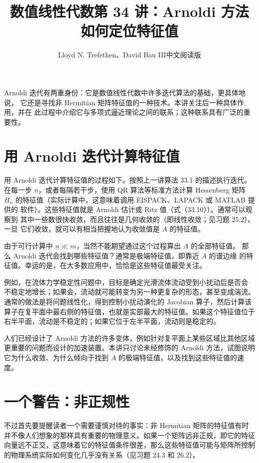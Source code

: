 \documentclass[UTF8,fontset=none,12pt]{ctexart}
\title{数值线性代数\quad 第 34 讲：Arnoldi 方法如何定位特征值}
\author{Lloyd N. Trefethen、David Bau III\quad 中文阅读版}
\date{}
\begin{document}
\maketitle
\pagestyle{plain}

Arnoldi 迭代有两重身份：它是数值线性代数中许多迭代算法的基础，更具体地说，
它还是寻找非 Hermitian 矩阵特征值的一种技术。本讲关注后一种具体作用，并在
此过程中介绍它与多项式逼近理论之间的联系；这种联系具有广泛的重要性。

\section*{用 Arnoldi 迭代计算特征值}

用 Arnoldi 迭代计算特征值的过程如下。按照上一讲算法 33.1 的描述执行迭代。
在每一步 $n$，或者每隔若干步，使用 QR 算法等标准方法计算 Hessenberg 矩阵
$H_n$ 的特征值（实际计算中，这意味着调用 EISPACK、LAPACK 或 MATLAB 提供的
软件）。这些特征值就是 Arnoldi 估计或 Ritz 值（式（33.10））。通常可以观察到
其中一些数很快收敛，而且往往是几何收敛的（即线性收敛；见习题 25.2）。一旦
它们收敛，就可以有相当把握地认为收敛值是 $A$ 的特征值。

由于可行计算中 $n\ll m$，当然不能期望通过这个过程算出 $A$ 的全部特征值。
那么 Arnoldi 迭代会找到哪些特征值？通常是极端特征值，即靠近 $A$ 的谱边缘
的特征值。幸运的是，在大多数应用中，恰恰是这些特征值最受关注。

例如，在流体力学稳定性问题中，目标是确定光滑流体流动受到小扰动后是否会
不稳定地增长；如果会，流动就可能转变为另一种更复杂的形态，甚至变成湍流。
通常的做法是将问题线性化，得到控制小扰动演化的 Jacobian 算子，然后计算该
算子在复平面中最右侧的特征值，也就是实部最大的特征值。如果这个特征值位于
右半平面，流动是不稳定的；如果它位于左半平面，流动则是稳定的。

人们已经设计了 Arnoldi 方法的许多变体，例如针对复平面上某些区域比其他区域
更重要的问题而设计的加速装置。本讲只讨论未经修饰的 Arnoldi 方法，试图说明
它为什么收敛、为什么倾向于找到 $A$ 的极端特征值，以及找到这些特征值的速度。

\section*{一个警告：非正规性}

不过首先要提醒读者一个需要谨慎对待的事实：非 Hermitian 矩阵的特征值有时
并不像人们想象的那样具有重要的物理意义。如果一个矩阵远非正规，即它的特征
向量远不正交，这意味着它的特征值条件很差，那么这些特征值可能与矩阵所控制
的物理系统实际如何变化几乎没有关系（见习题 24.3 和 26.2）。
\end{document}
